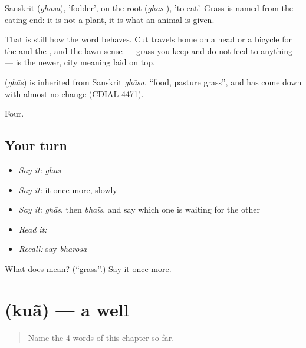 Sanskrit  (\emph{ghāsa}), 'fodder', on the root  (\emph{ghas-}), 'to eat'. Grass is named from the eating end: it is not a plant, it is what an animal is given.

That is still how the word behaves. Cut  travels home on a head or a bicycle for the  and the , and the lawn sense — grass you keep and do not feed to anything — is the newer, city meaning laid on top.

\begin{cousinweb}
\textbf{} (\emph{ghās}) is inherited from Sanskrit \emph{ghāsa}, \textquotedblleft{}food, pasture grass\textquotedblright{}, and has come down with almost no change (CDIAL 4471).
\end{cousinweb}

\begin{grammarlens}[title={What you've built}]
Four.
\end{grammarlens}

\subsection*{Your turn}
\begin{itemize}
\raggedright
  \item \emph{Say it:} \emph{ghās}
  \item \emph{Say it:} it once more, slowly
  \item \emph{Say it:} \emph{ghās}, then \emph{bhaĩs}, and say which one is waiting for the other
  \item \emph{Read it:} \textbf{}
  \item \emph{Recall:} say \emph{bharosā}
\end{itemize}

\begin{tcolorbox}[breakable,colback=teal!4,colframe=teal!35!black,title={Before you move on}]
What does  mean? (\textquotedblleft{}grass\textquotedblright{}.) Say it once more.
\end{tcolorbox}
\section[\texorpdfstring{\hi{कुआँ} (kuā̃)}{कुआँ (kuā̃)}]{ (kuā̃) — a well}

\label{lesson:HI-C66-well}



\begin{quote}
Name the 4 words of this chapter so far.
\end{quote}


